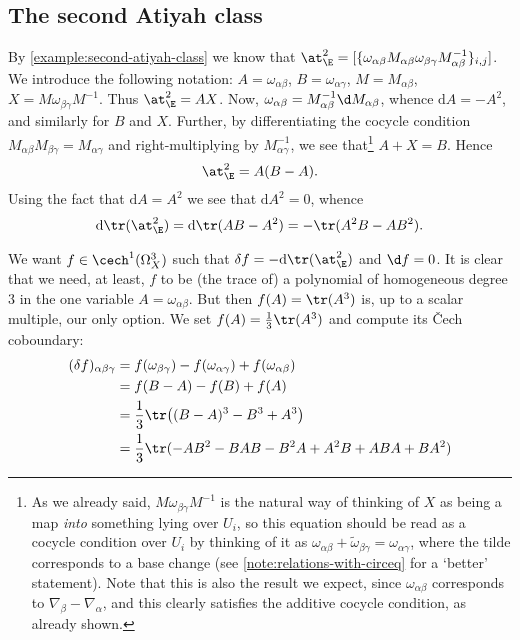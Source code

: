     


    \subsection{The second Atiyah class} %
    \label{sub:the_second_atiyah_class}
        
            By \cref{example:second-atiyah-class} we know that $\at_\E^2 = [\{\omega_{\alpha\beta}M_{\alpha\beta}\omega_{\beta\gamma}M_{\alpha\beta}^{-1}\}_{i,j}]$.
            We introduce the following notation: $A=\omega_{\alpha\beta}$, $B=\omega_{\alpha\gamma}$, $M=M_{\alpha\beta}$, $X=M\omega_{\beta\gamma}M^{-1}$.
            Thus $\at_\E^2=AX$.
            Now, $\omega_{\alpha\beta} = M_{\alpha\beta}^{-1}\d M_{\alpha\beta}$, whence $\mathrm{d}A = -A^2$, and similarly for $B$ and $X$.
            Further, by differentiating the cocycle condition $M_{\alpha\beta}M_{\beta\gamma} = M_{\alpha\gamma}$ and right-multiplying by $M_{\alpha\gamma}^{-1}$, we see that\footnote{As we already said, $M\omega_{\beta\gamma}M^{-1}$ is the natural way of thinking of $X$ as being a map \textit{into} something lying over $U_i$, so this equation should be read as a cocycle condition over $U_i$ by thinking of it as $\omega_{\alpha\beta}+\tilde{\omega}_{\beta\gamma}=\omega_{\alpha\gamma}$, where the tilde corresponds to a base change (see \cref{note:relations-with-circeq} for a `better' statement). Note that this is also the result we expect, since $\omega_{\alpha\beta}$ corresponds to $\nabla_\beta-\nabla_\alpha$, and this clearly satisfies the additive cocycle condition, as already shown.} \mbox{$A+X=B$}.
            Hence
            \[
                \at_\E^2=A(B-A).
            \]
            Using the fact that $\mathrm{d}A=A^2$ we see that $\mathrm{d}A^2=0$, whence
            \[
                \mathrm{d}\tr(\at_\E^2) = \mathrm{d}\tr(AB-A^2) = -\tr(A^2B-AB^2).
            \]

            We want $f\in\cech^1(\Omega_X^3)$ such that $\delta f=-\mathrm{d}\tr(\at_\E^2)$ and $\d f=0$.
            It is clear that we need, at least, $f$ to be (the trace of) a polynomial of homogeneous degree $3$ in the one variable $A=\omega_{\alpha\beta}$.
            But then $f(A)=\tr(A^3)$ is, up to a scalar multiple, our only option.
            We set $f(A)=\frac13\tr(A^3)$ and compute its Čech coboundary:
            \begin{align*}
                (\delta f)_{\alpha\beta\gamma} &= f(\omega_{\beta\gamma})-f(\omega_{\alpha\gamma})+f(\omega_{\alpha\beta})\\
                &= f(B-A)-f(B)+f(A)\\
                &= \frac13\tr\big((B-A)^3-B^3+A^3\big)\\
                &= \frac13\tr(-AB^2 -BAB - B^2A + A^2B + ABA + BA^2)
            \end{align*}


